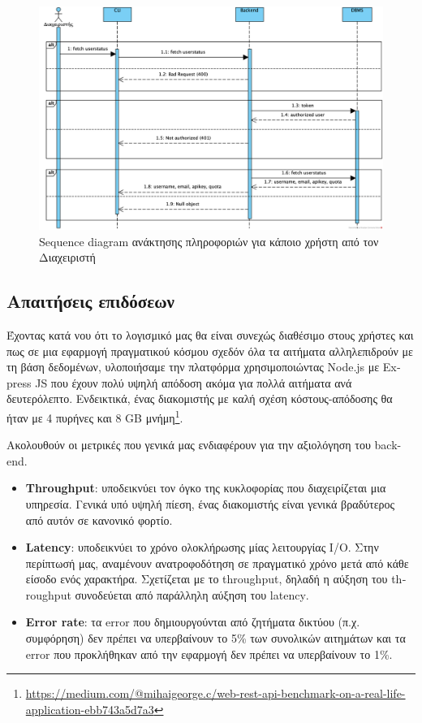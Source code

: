 \documentclass[a4paper,12pt, oneside]{article}
\begin{document}
\begin{figure}[h]
\includegraphics[width=1\textwidth]{./UML/Sequence_Diagram_Admin_fetch_userstatus.png}
\caption{\textlatin{Sequence diagram} ανάκτησης πληροφοριών για κάποιο χρήστη από τον Διαχειριστή}
\centering
\end{figure}



\newpage
\subsection{Απαιτήσεις επιδόσεων}
Έχοντας κατά νου ότι το λογισμικό μας θα είναι συνεχώς διαθέσιμο στους χρήστες και πως σε μια εφαρμογή πραγματικού κόσμου σχεδόν όλα τα αιτήματα αλληλεπιδρούν με τη βάση δεδομένων, υλοποιήσαμε την πλατφόρμα χρησιμοποιώντας \textlatin{Node.js} με \textlatin{Express JS} που έχουν πολύ υψηλή απόδοση ακόμα για πολλά αιτήματα ανά δευτερόλεπτο. Ενδεικτικά, ένας διακομιστής με καλή σχέση κόστους-απόδοσης θα ήταν με 4 πυρήνες και 8 \textlatin{GB} μνήμη\footnote{\textlatin{\href{https://medium.com/@mihaigeorge.c/web-rest-api-benchmark-on-a-real-life-application-ebb743a5d7a3}{https://medium.com/@mihaigeorge.c/web-rest-api-benchmark-on-a-real-life-application-ebb743a5d7a3}}}.

Ακολουθούν οι μετρικές που γενικά μας ενδιαφέρουν για την αξιολόγηση του \textlatin{back-end}.
\begin{itemize}
	\item \textbf{\textlatin{Throughput}}: υποδεικνύει τον όγκο της κυκλοφορίας που διαχειρίζεται μια υπηρεσία. Γενικά υπό υψηλή πίεση, ένας διακομιστής είναι γενικά βραδύτερος από αυτόν σε κανονικό φορτίο.
	\item \textbf{\textlatin{Latency}}: υποδεικνύει το χρόνο ολοκλήρωσης μίας λειτουργίας I/O. Στην περίπτωσή μας, αναμένουν ανατροφοδότηση σε πραγματικό χρόνο μετά από κάθε είσοδο ενός χαρακτήρα. Σχετίζεται με το \textlatin{throughput}, δηλαδή η αύξηση του \textlatin{throughput} συνοδεύεται από παράλληλη αύξηση του \textlatin{latency}.
	\item \textbf{\textlatin{Error rate}}: τα \textlatin{error} που δημιουργούνται από ζητήματα δικτύου (π.χ. συμφόρηση)  δεν πρέπει να υπερβαίνουν το 5\% των συνολικών αιτημάτων και τα \textlatin{error}  που προκλήθηκαν από την εφαρμογή δεν πρέπει να υπερβαίνουν το 1\%.
\end{itemize} 
\end{document}
